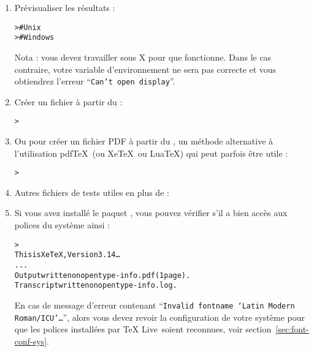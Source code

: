 \documentclass[german, english, french]{article}
\renewcommand{\samp}[1]{\enquote{\texttt{#1}}}
\renewcommand{\TL}{\TeX{} Live\xspace}%
\begin{document}
\begin{enumerate}
\item Prévisualiser les résultats :
\begin{alltt}
>     # Unix
>   # Windows
\end{alltt}
Nota : vous devez travailler sous X pour que  fonctionne.  Dans le
cas contraire, votre variable d'environnement  ne sera pas
correcte et vous obtiendrez l'erreur \samp{Can't open display}.

\item Créer un fichier \PS{} à partir du \dvi{} :
\begin{alltt}
> 
\end{alltt}

\item Ou pour créer un fichier PDF à partir du \dvi{}, un méthode alternative
  à l'utilisation pdf\TeX\ (ou Xe\TeX\ ou Lua\TeX) qui peut parfois être utile :
\begin{alltt}
> 
\end{alltt}

\item Autres fichiers de tests utiles en plus de  :


\item Si vous avez installé le paquet , vous pouvez vérifier s'il
  a bien accès aux polices du système ainsi :
  \begin{alltt}
> 
This is XeTeX, Version 3.14\dots
...
Output written on opentype-info.pdf (1 page).
Transcript written on opentype-info.log.
\end{alltt}

En cas de message d'erreur contenant \samp{Invalid fontname `Latin Modern
  Roman/ICU'\dots}, alors vous devez revoir la configuration de votre système
pour que les polices installées par \TL\ soient reconnues, voir
section~\ref{sec:font-conf-sys}.

\end{enumerate}
\end{document}
